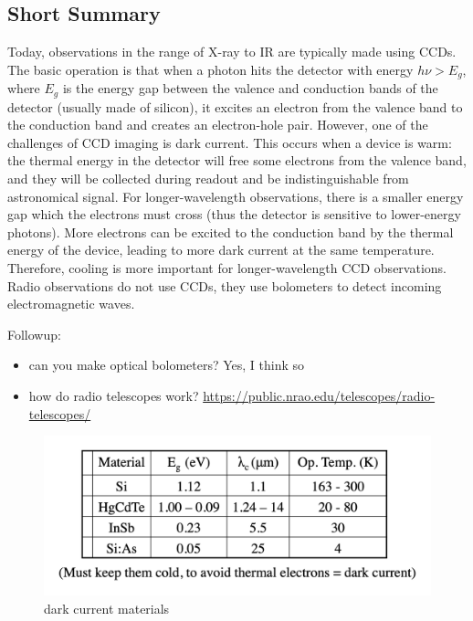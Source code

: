 \documentclass[\main/main.tex]{subfiles}
\begin{document}
    \subsection{Short Summary}
    Today, observations in the range of X-ray to IR are typically made using CCDs. The basic operation is that when a photon hits the detector with energy $h\nu > E_g$, where $E_g$ is the energy gap between the valence and conduction bands of the detector (usually made of silicon), it excites an electron from the valence band to the conduction band and creates an electron-hole pair. However, one of the challenges of CCD imaging is dark current. This occurs when a device is warm: the thermal energy in the detector will free some electrons from the valence band, and they will be collected during readout and be indistinguishable from astronomical signal. For longer-wavelength observations, there is a smaller energy gap which the electrons must cross (thus the detector is sensitive to lower-energy photons). More electrons can be excited to the conduction band by the thermal energy of the device, leading to more dark current at the same temperature. Therefore, cooling is more important for longer-wavelength CCD observations. Radio observations do not use CCDs, they use bolometers to detect incoming electromagnetic waves.
    
    Followup:
    \begin{itemize}
        \item can you make optical bolometers? Yes, I think so
        \item how do radio telescopes work? \href{https://public.nrao.edu/telescopes/radio-telescopes/}{https://public.nrao.edu/telescopes/radio-telescopes/}
    \end{itemize}{}
    
    \begin{figure}
        \centering
        \includegraphics{Answers/images/physics_and_fundamentals/dark_current_materials.png}
        \caption{dark current materials}
        \label{fig:dark_current_materials}
    \end{figure}{}
    
\end{document}

